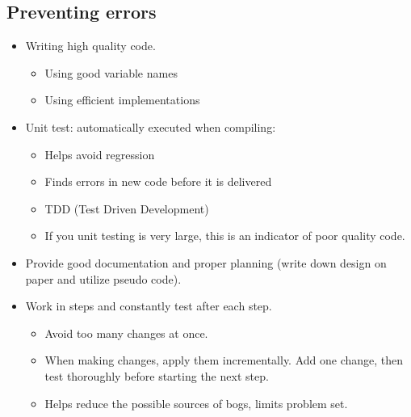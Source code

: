 \subsection{Preventing errors}
\begin{itemize}
    \item Writing high quality code. 
        \begin{itemize}
            \item Using good variable names 
            \item Using efficient implementations
        \end{itemize}
    \item Unit test: automatically executed when compiling:
        \begin{itemize}
            \item Helps avoid regression 
            \item Finds errors in new code before it is delivered 
            \item TDD (Test Driven Development)
            \item If you unit testing is very large, this is an indicator of poor quality code. 
        \end{itemize}
    
    \item Provide good documentation and proper planning (write down design on paper and utilize pseudo code).
    \item Work in steps and constantly test after each step.
        \begin{itemize}
            \item Avoid too many changes at once. 
            \item When making changes, apply them incrementally. Add one change, then test thoroughly before starting the next step.
            \item Helps reduce the possible sources of bogs, limits problem set.
        \end{itemize}
\end{itemize}



